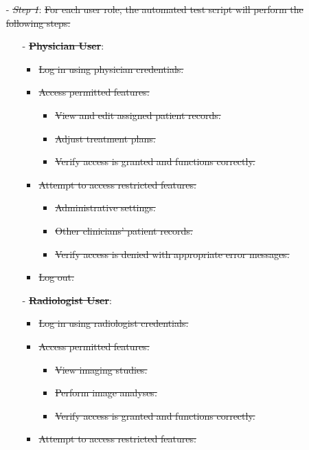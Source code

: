 \documentclass[12pt, titlepage]{article}
\begin{document}
\begin{enumerate}
\begin{itemize}
  \item[-] \textit{\sout{Step 1}}: \sout{For each user role, the automated test script will perform the following steps:}
    \begin{itemize}
      \item[-] \textbf{\sout{Physician User}}:
        \begin{itemize}
          \item \sout{Log in using physician credentials.}
          \item \sout{Access permitted features:}
            \begin{itemize}
              \item \sout{View and edit assigned patient records.}
              \item \sout{Adjust treatment plans.}
              \item \sout{Verify access is granted and functions correctly.}
            \end{itemize}
          \item \sout{Attempt to access restricted features:}
            \begin{itemize}
              \item \sout{Administrative settings.}
              \item \sout{Other clinicians' patient records.}
              \item \sout{Verify access is denied with appropriate error messages.}
            \end{itemize}
          \item \sout{Log out.}
        \end{itemize}
      \item[-] \textbf{\sout{Radiologist User}}:
        \begin{itemize}
          \item \sout{Log in using radiologist credentials.}
          \item \sout{Access permitted features:}
            \begin{itemize}
              \item \sout{View imaging studies.}
              \item \sout{Perform image analyses.}
              \item \sout{Verify access is granted and functions correctly.}
            \end{itemize}
          \item \sout{Attempt to access restricted features:}

\end{itemize}
\end{itemize}
\end{itemize}
\end{enumerate}
\end{document}
